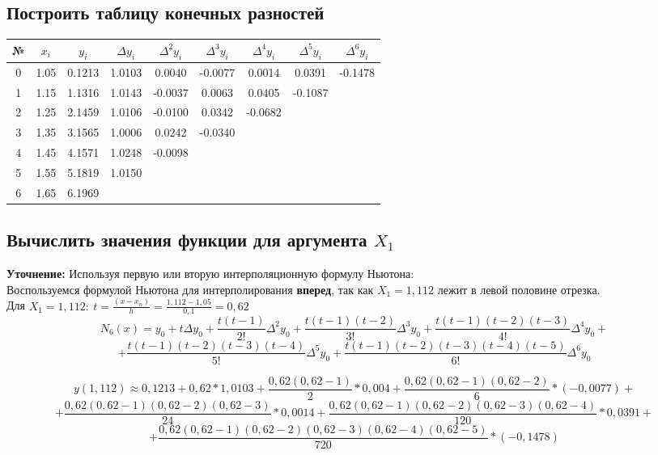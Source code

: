 \documentclass[12pt]{article}
\begin{document}
\subsection{Построить таблицу конечных разностей}
\begin{center}
\begin{tabular}{|c|c|c|c|c|c|c|c|c|}
  \hline
  № & $x_i$ & $y_i$ & $\Delta y_i$ & $\Delta^2 y_i$ & $\Delta^3 y_i$ & $\Delta^4 y_i$ & $\Delta^5 y_i$ & $\Delta^6 y_i$ \\
  \hline
  0 & 1.05 & 0.1213 & 1.0103 & 0.0040 & -0.0077 & 0.0014 & 0.0391 & -0.1478 \\
  1 & 1.15 & 1.1316 & 1.0143 & -0.0037 & 0.0063 & 0.0405 & -0.1087 & \\
  2 & 1.25 & 2.1459 & 1.0106 & -0.0100 & 0.0342 & -0.0682 & & \\
  3 & 1.35 & 3.1565 & 1.0006 & 0.0242 & -0.0340 & & & \\
  4 & 1.45 & 4.1571 & 1.0248 & -0.0098 & & & & \\
  5 & 1.55 & 5.1819 & 1.0150 & & & & & \\
  6 & 1.65 & 6.1969 & & & & & & \\
  \hline
\end{tabular}
\end{center}

\subsection{Вычислить значения функции для аргумента $X_1$}
\textbf{Уточнение:} Используя первую или вторую интерполяционную формулу Ньютона:\\
\vspace{5mm}
Воспользуемся формулой Ньютона для интерполирования \textbf{вперед}, так как $X_1 = 1,112$ лежит в левой половине отрезка.\\
\vspace{5mm}
Для $X_1 = 1,112: \ t = \frac{(x-x_n)}{h} = \frac{1,112-1,05}{0,1} = 0,62 $\\
\vspace{5mm}
$$N_6(x) = y_0 + t\Delta y_0 + \frac{t(t-1)}{2!} \Delta^2 y_0 + \frac{t(t-1)(t-2)}{3!} \Delta^3 y_0 + \frac{t(t-1)(t-2)(t-3)}{4!} \Delta^4 y_0 + $$
$$ + \frac{t(t-1)(t-2)(t-3)(t-4)}{5!} \Delta^5 y_0 + \frac{t(t-1)(t-2)(t-3)(t-4)(t-5)}{6!} \Delta^6 y_0 $$

$$ y(1,112) \approx 0,1213 + 0,62*1,0103 + \frac{0,62(0,62 - 1)}{2} * 0,004 + \frac{0,62(0,62-1)(0,62-2)}{6}*(-0,0077) + $$
$$ + \frac{0,62(0,62-1)(0,62-2)(0,62-3)}{24} * 0,0014 + \frac{0,62(0,62-1)(0,62-2)(0,62-3)(0,62-4)}{120} * 0,0391 + $$
$$ + \frac{0,62(0,62-1)(0,62-2)(0,62-3)(0,62-4)(0,62-5)}{720} * (-0,1478) $$
\end{document}
